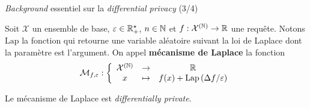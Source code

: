 \documentclass[10pt,serif]{beamer}
\begin{document}
  \begin{frame}{\textit{Background} essentiel sur la \textit{differential privacy} (3/4)}
    \begin{definition}
      Soit \(\mathcal X\) un ensemble de base, \(\varepsilon \in \mathbb{R}_+^\star\), \(n \in \mathbb{N}\) et \(f : \mathcal X^{(\mathbb{N})} \to \mathbb{R}\) une requête. Notons \(\text{Lap}\) la fonction qui retourne une variable aléatoire suivant la loi de {\sc Laplace} dont la paramètre est l'argument. On appel \textbf{mécanisme de {\sc Laplace}} la fonction 
      \[
          \mathcal M_{f,\varepsilon} : \left\{ 
              \begin{array}{ccc}
                  \mathcal X^{(\mathbb{N})} & \to & \mathbb{R}\\
                  x & \mapsto & f(x) + \text{Lap}\left( {\Delta f}/{\varepsilon} \right)
              \end{array}
          \right.    
      \]
    \end{definition}

    \begin{theorem}
      Le mécanisme de {\sc Laplace} est \textit{differentially private}.
  \end{theorem}
  \end{frame}
\end{document}
